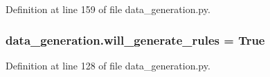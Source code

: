 Definition at line 159 of file data\+\_\+generation.\+py.

\hypertarget{namespacedata__generation_abf6964c9992abb3c8c479fa568833f1c}{
\subsubsection[{will\+\_\+generate\+\_\+rules}]{\setlength{\rightskip}{0pt plus 5cm}data\+\_\+generation.\+will\+\_\+generate\+\_\+rules = True}}\label{namespacedata__generation_abf6964c9992abb3c8c479fa568833f1c}


Definition at line 128 of file data\+\_\+generation.\+py.

